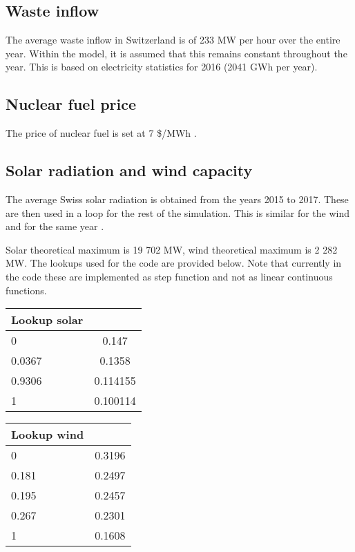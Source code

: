 \subsection{Waste inflow}

The average waste inflow in Switzerland is of 233 MW per hour over the entire year. Within the model, it is assumed that this remains constant throughout the year. This is based on electricity statistics for 2016 (2041 GWh per year).


\subsection{Nuclear fuel price}

The price of nuclear fuel is set at 7 \$/MWh \citep{NREL2018annual}.


\subsection{Solar radiation and wind capacity}

The average Swiss solar radiation is obtained from the years 2015 to 2017. These are then used in a loop for the rest of the simulation. This is similar for the wind and for the same year \citep{sfoe2018Elektrizitatsstatistik}.

Solar theoretical maximum is 19 702 MW, wind theoretical maximum is 2 282 MW. The lookups used for the code are provided below. Note that currently in the code these are implemented as step function and not as linear continuous functions.

\begin{center}
\begin{tabular}{ |l|c| } 
\hline
Lookup solar
		& 	\\ \hline \hline
0		& 0.147		\\ \hline
0.0367	& 0.1358		\\ \hline
0.9306	& 0.114155	\\ \hline
1		& 0.100114	\\ \hline
\end{tabular}
\end{center}


\begin{center}
\begin{tabular}{ |l|c| } 
\hline
Lookup wind
		& 	\\ \hline \hline
0		& 0.3196	\\ \hline
0.181	& 0.2497	\\ \hline
0.195	& 0.2457	\\ \hline
0.267	& 0.2301	\\ \hline
1		& 0.1608	\\ \hline
\end{tabular}
\end{center}

